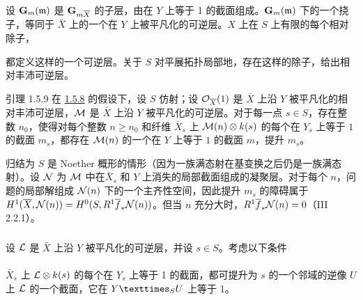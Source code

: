 设 $\mathbf{G}_{m}(\mathfrak{m})$ 是 $\mathbf{G}_{m\overline{X}}$ 的子层，由在 $Y$ 上等于 1 的截面组成。$\mathbf{G}_{m}(\mathfrak{m})$ 下的一个挠子，等同于 $\bar{X}$ 上的一个在 $Y$ 上被平凡化的可逆层。$X$ 上在 $S$ 上有限的每个相对除子，

都定义这样的一个可逆层。关于 $S$ 对平展拓扑局部地，存在这样的除子，给出相对丰沛可逆层。

\begin{enonce*}{引理 1.5.9}
在 \hyperref[XVIII.subsubsec1.5.8]{1.5.8} 的假设下，设 $S$ 仿射；设 ${\mathcal O}_{\overline{X}}(1)$ 是 $\bar{X}$ 上沿 $Y$ 被平凡化的相对丰沛可逆层，${\mathcal M}$ 是 $\bar{X}$ 上沿 $Y$ 被平凡化的可逆层。对于每一点 $s\in S$，存在整数 $n_{0}$，使得对每个整数 $n\geq n_{0}$ 和纤维 $\bar{X}_{s}$ 上 ${\mathcal M}(n)\otimes k(s)$ 的每个在 $Y_{s}$ 上等于 $1$ 的截面 $m_{s}$，都存在 ${\mathcal M}(n)$ 的一个在 $Y$ 上等于 $1$ 的截面 $m$，提升 $m_{s}$。
\end{enonce*}

归结为 $S$ 是 Noether 概形的情形（因为一族满态射在基变换之后仍是一族满态射）。设 ${\mathcal N}$ 为 ${\mathcal M}$ 中在\pageoriginale $\bar{X}_{s}$ 和 $Y$ 上消失的局部截面组成的凝聚层。对于每个 $n$，问题的局部解组成 ${\mathcal N}(n)$ 下的一个主齐性空间，因此提升 $m_{s}$ 的障碍属于 $H^{1}(\overline{X},{\mathcal N}(n))=H^{0}(S,R^{1}\overline{f}_{\ast}{\mathcal N}(n))$。但当 $n$ 充分大时，$R^{1}\overline{f}_{\ast}{\mathcal N}(n)=0$（\EGA III 2.2.1）。

\setcounter{subsubsection}{9}
\subsubsection{}
设 ${\mathcal L}$ 是 $\bar{X}$ 上沿 $Y$ 被平凡化的可逆层，并设 $s\in S$。考虑以下条件

\paragraph{}
$\bar{X}_{s}$ 上 ${\mathcal L}\otimes k(s)$ 的每个在 $Y_{s}$ 上等于 1 的截面，都可提升为 $s$ 的一个邻域的逆像 $U$ 上 ${\mathcal L}$ 的一个截面，它在 $\fprod{Y}{U}{S}$ 上等于 1。

